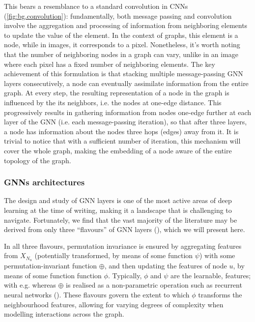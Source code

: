 \documentclass[binding=0.6cm]{sapthesis}
\newcommand{\mycite}[1]{(\cite{#1})}
\begin{document}
This bears a resemblance to a standard convolution in CNNs (\cref{fig:bg.convolution}): fundamentally, both message passing and convolution involve the aggregation and processing of information from neighboring elements to update the value of the element. In the context of graphs, this element is a node, while in images, it corresponds to a pixel. Nonetheless, it's worth noting that the number of neighboring nodes in a graph can vary, unlike in an image where each pixel has a fixed number of neighboring elements. The key achievement of this formulation is that stacking multiple message-passing GNN layers consecutively, a node can eventually assimilate information from the entire graph. At every step, the resulting representation of a node in the graph is influenced by the its neighbors, i.e. the nodes at one-edge distance. This progressively results in gathering information from nodes one-edge further at each layer of the GNN (i.e. each message-passing iteration), so that after three layers, a node has information about the nodes three hops (edges) away from it. It is trivial to notice that with a sufficient number of iteration, this mechanism will cover the whole graph, making the embedding of a node aware of the entire topology of the graph.



\subsubsection{GNNs architectures}
\label{sec:bg.gnn.gnn-archs}
The design and study of GNN layers is one of the most active areas of deep learning at the time of writing, making it a landscape that is challenging to navigate. Fortunately, we find that the vast majority of the literature may be derived from only three “flavours” of GNN layers \mycite{bronstein2021geometric}, which we will present here.

In all three flavours, permutation invariance is ensured by aggregating features from $X_{N_u}$ (potentially transformed, by means of some function $\psi$) with some permutation-invariant function $\oplus$, and then updating the features of node $u$, by means of some function function $\phi$. Typically, $\phi$ and $\psi$ are the learnable, features; with e.g. whereas $\oplus$ is realised as a non-parametric operation such as recurrent neural networks (\cite{murphy2019janossy}). These flavours govern the extent to which $\phi$ transforms the neighbourhood features, allowing for varying degrees of complexity when modelling interactions across the graph.
\end{document}
